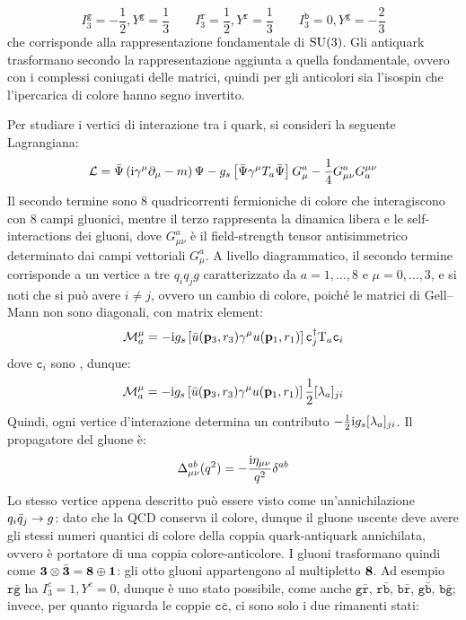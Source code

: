 \begin{equation*}
  I_3^\mathtt{g} = -\frac{1}{2} , Y^\mathtt{g} = \frac{1}{3}
  \qquad
  I_3^\mathtt{r} = \frac{1}{2} , Y^\mathtt{r} = \frac{1}{3}
  \qquad
  I_3^\mathtt{b} = 0 , Y^\mathtt{g} = - \frac{2}{3}
\end{equation*}
che corrisponde alla rappresentazione fondamentale di $ \mathrm{SU}(3) $. Gli antiquark trasformano secondo la rappresentazione aggiunta a quella fondamentale, ovvero con i complessi coniugati delle matrici, quindi per gli anticolori sia l'isospin che l'ipercarica di colore hanno segno invertito.

Per studiare i vertici di interazione tra i quark, si consideri la seguente Lagrangiana:
\begin{equation}
  \mathcal{L} = \bar{\Psi} \left( \mathrm{i} \gamma^\mu \partial_\mu - m \right) \Psi - g_s \left[ \bar{\Psi} \gamma^\mu T_a \bar{\Psi} \right] G_\mu^a - \frac{1}{4} G_{\mu \nu}^a G_a^{\mu \nu}
\end{equation}
Il secondo termine sono 8 quadricorrenti fermioniche di colore che interagiscono con 8 campi gluonici, mentre il terzo rappresenta la dinamica libera e le self-interactions dei gluoni, dove $ G_{\mu \nu}^a $ è il field-strength tensor antisimmetrico determinato dai campi vettoriali $ G_\mu^a $. A livello diagrammatico, il secondo termine corrisponde a un vertice a tre $ q_i q_j g $ caratterizzato da $ a = 1, \dots, 8 $ e $ \mu = 0 , \dots , 3 $, e si noti che si può avere $ i \neq j $, ovvero un cambio di colore, poiché le matrici di Gell--Mann non sono diagonali, con matrix element:
\begin{equation*}
  \mathcal{M}^\mu_a = -\mathrm{i} g_s \left[ \bar{u}(\mathbf{p}_3 , r_3) \gamma^\mu u(\mathbf{p}_1 , r_1) \right] \mathtt{c}_j^\dagger \mathrm{T}_a \mathtt{c}_i
\end{equation*}
dove $ \mathtt{c}_i $ sono , dunque:
\begin{equation}
  \mathcal{M}_a^\mu = - \mathrm{i} g_s \left[ \bar{u}(\mathbf{p}_3 , r_3) \gamma^\mu u(\mathbf{p}_1 , r_1) \right] \frac{1}{2} [\lambda_a]_{ji}
\end{equation}
Quindi, ogni vertice d'interazione determina un contributo $ - \frac{1}{2} \mathrm{i} g_s [\lambda_a]_{ji} $. Il propagatore del gluone è:
\begin{equation*}
  \Delta_{\mu \nu}^{ab}(q^2) = - \frac{\mathrm{i} \eta_{\mu \nu}}{q^2} \delta^{ab}
\end{equation*}
Lo stesso vertice appena descritto può essere visto come un'annichilazione $ q_i \bar{q}_j \rightarrow g $: dato che la QCD conserva il colore, dunque il gluone uscente deve avere gli stessi numeri quantici di colore della coppia quark-antiquark annichilata, ovvero è portatore di una coppia colore-anticolore. I gluoni trasformano quindi come $ \mathbf{3} \otimes \bar{\mathbf{3}} = \mathbf{8} \oplus \mathbf{1} $: gli otto gluoni appartengono al multipletto $ \mathbf{8} $. Ad esempio $ \mathtt{r}\bar{\mathtt{g}} $ ha $ I_3^c = 1 , Y^c = 0 $, dunque è uno stato possibile, come anche $ \mathtt{g}\bar{\mathtt{r}} $, $ \mathtt{r}\bar{\mathtt{b}} $, $ \mathtt{b}\bar{\mathtt{r}} $, $ \mathtt{g}\bar{\mathtt{b}} $, $ \mathtt{b}\bar{\mathtt{g}} $; invece, per quanto riguarda le coppie $ \mathtt{c}\bar{\mathtt{c}} $, ci sono solo i due rimanenti stati:

